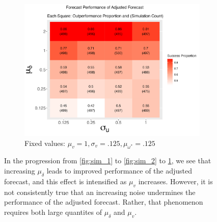 \documentclass[11pt,3p,review,authoryear]{elsarticle}
\theoremstyle{definition}
\begin{document}
\begin{figure}[!h]
    \begin{subfigure}{.44\linewidth} 
      \centering
        \includegraphics[scale=.42]{simulation_plots/Aug28_224322_2024_mu[delta]_sigma[u].png}
        \caption{Fixed values: $\mu_{v} = 1, \sigma_{v} = .125, \mu_{\omega^{*}} = .125$}\label{fig:sim_3}
    \end{subfigure}
    
        \caption{In the progression from \ref{fig:sim_1} to \ref{fig:sim_2} to \ref{fig:sim_3}, we see that increasing $\mu_{\delta}$ leads to improved performance of the adjusted forecast, and this effect is intensified as $\mu_{v}$ increases.  However, it is not consistently true that an increasing noise undermines the performance of the adjusted forecast.  Rather, that phenomenon requires both large quantites of $\mu_{\delta}$ and $\mu_{v}$.}
        \label{fig:signoise}
      \end{figure}
\end{document}
